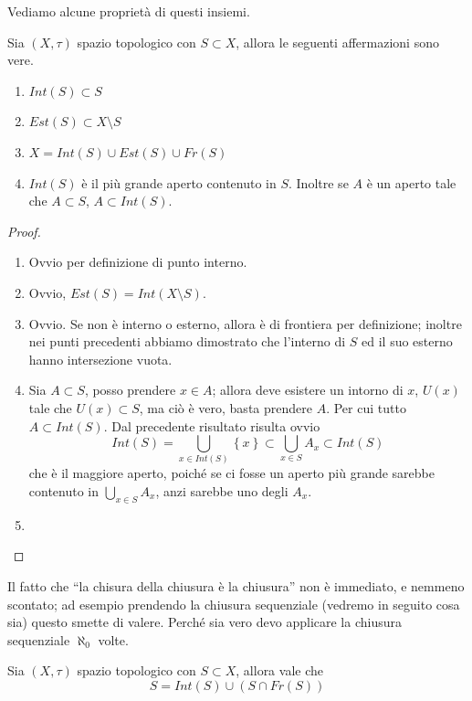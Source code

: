 Vediamo alcune proprietà di questi insiemi.

\begin{proposition}
	Sia $(X,\tau)$ spazio topologico con $S \subset X$, allora le seguenti affermazioni sono vere.
	\begin{enumerate}
		\item $Int(S) \subset S$
		\item $Est(S) \subset X \setminus S$
		\item $X = Int(S) \cup Est(S) \cup Fr(S)$ 
		\item $Int(S)$ è il più grande aperto contenuto in $S$. Inoltre se $A$ è un aperto tale che $A \subset S$, $A \subset Int(S)$.	
	\end{enumerate}
\end{proposition}
\begin{proof} \
	\begin{enumerate}
		\item Ovvio per definizione di punto interno.
		\item Ovvio, $Est(S)=Int(X\setminus S)$.
		\item Ovvio. Se non è interno o esterno, allora è di frontiera per definizione; inoltre nei punti precedenti abbiamo dimostrato che l'interno di $S$ ed il suo esterno hanno intersezione vuota.
		\item Sia $A \subset S$, posso prendere $x \in A$; allora deve esistere un intorno di $x$, $U(x)$ tale che $U(x) \subset S$, ma ciò è vero, basta prendere $A$. Per cui tutto $A \subset Int(S)$. Dal precedente risultato risulta ovvio
		\begin{equation*}
			Int(S) = \bigcup_{x\in Int(S)} \left\{x\right\} \subset \bigcup_{x \in S} A_x \subset Int(S) 
		\end{equation*}
		che è il maggiore aperto, poiché se ci fosse un aperto più grande sarebbe contenuto in $\bigcup_{x \in S} A_x$, anzi sarebbe uno degli $A_x$.
		\item 
	\end{enumerate}
\end{proof}

Il fatto che \enquote{la chisura della chiusura è la chiusura} non è immediato, e nemmeno scontato; ad esempio prendendo la chiusura sequenziale (vedremo in seguito cosa sia) questo smette di valere. Perché sia vero devo applicare la chiusura sequenziale $\aleph_0$ volte.

\begin{theorem}
	\label{thr:set_decomposition_inner_frontier}
	Sia $(X,\tau)$ spazio topologico con $S \subset X$, allora vale che
	\begin{equation*}
	S = Int(S) \cup (S \cap Fr(S))
	\end{equation*}
\end{theorem}

